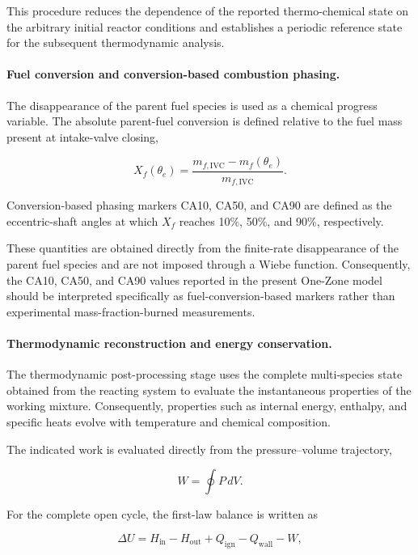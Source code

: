 \documentclass[man,floatsintext,noextraspace]{apa6}
\begin{document}
This procedure reduces the dependence of the reported thermo-chemical state on the arbitrary initial reactor conditions and establishes a periodic reference state for the subsequent thermodynamic analysis.

\paragraph{Fuel conversion and conversion-based combustion phasing.}

The disappearance of the parent fuel species is used as a chemical progress variable. The absolute parent-fuel conversion is defined relative to the fuel mass present at intake-valve closing,

\begin{equation}
X_f(\theta_e)
=
\frac{m_{f,\mathrm{IVC}}-m_f(\theta_e)}
{m_{f,\mathrm{IVC}}}.
\end{equation}

Conversion-based phasing markers CA10, CA50, and CA90 are defined as the eccentric-shaft angles at which $X_f$ reaches 10\%, 50\%, and 90\%, respectively.

These quantities are obtained directly from the finite-rate disappearance of the parent fuel species and are not imposed through a Wiebe function. Consequently, the CA10, CA50, and CA90 values reported in the present One-Zone model should be interpreted specifically as fuel-conversion-based markers rather than experimental mass-fraction-burned measurements.

\paragraph{Thermodynamic reconstruction and energy conservation.}

The thermodynamic post-processing stage uses the complete multi-species state obtained from the reacting system to evaluate the instantaneous properties of the working mixture. Consequently, properties such as internal energy, enthalpy, and specific heats evolve with temperature and chemical composition.

The indicated work is evaluated directly from the pressure--volume trajectory,

\begin{equation}
W=\oint P\,dV.
\end{equation}

For the complete open cycle, the first-law balance is written as

\begin{equation}
\Delta U
=
H_{\mathrm{in}}
-
H_{\mathrm{out}}
+
Q_{\mathrm{ign}}
-
Q_{\mathrm{wall}}
-
W,
\end{equation}
\end{document}
